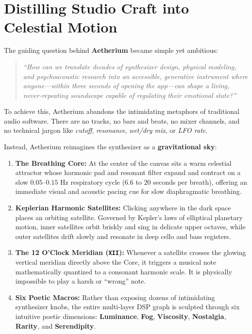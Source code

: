 \documentclass[11pt,oneside,openany]{book}
\begin{document}
\section{Distilling Studio Craft into Celestial Motion}

The guiding question behind \textbf{Aetherium} became simple yet ambitious:
\begin{quote}
\itshape
``How can we translate decades of synthesizer design, physical modeling, and psychoacoustic research into an accessible, generative instrument where anyone---within three seconds of opening the app---can shape a living, never-repeating soundscape capable of regulating their emotional state?''
\end{quote}

To achieve this, Aetherium abandons the intimidating metaphors of traditional audio software. There are no tracks, no bars and beats, no mixer channels, and no technical jargon like \textit{cutoff}, \textit{resonance}, \textit{wet/dry mix}, or \textit{LFO rate}.

Instead, Aetherium reimagines the synthesizer as a \textbf{gravitational sky}:
\begin{enumerate}
  \item \textbf{The Breathing Core:} At the center of the canvas sits a warm celestial attractor whose harmonic pad and resonant filter expand and contract on a slow $0.05\text{--}0.15\text{ Hz}$ respiratory cycle ($6.6$ to $20$ seconds per breath), offering an immediate visual and acoustic pacing cue for slow diaphragmatic breathing.
  \item \textbf{Keplerian Harmonic Satellites:} Clicking anywhere in the dark space places an orbiting satellite. Governed by Kepler's laws of elliptical planetary motion, inner satellites orbit briskly and sing in delicate upper octaves, while outer satellites drift slowly and resonate in deep cello and bass registers.
  \item \textbf{The 12 O'Clock Meridian (\texttt{XII}):} Whenever a satellite crosses the glowing vertical meridian directly above the Core, it triggers a musical note mathematically quantized to a consonant harmonic scale. It is physically impossible to play a harsh or ``wrong'' note.
  \item \textbf{Six Poetic Macros:} Rather than exposing dozens of intimidating synthesizer knobs, the entire multi-layer DSP graph is sculpted through six intuitive poetic dimensions: \textbf{Luminance}, \textbf{Fog}, \textbf{Viscosity}, \textbf{Nostalgia}, \textbf{Rarity}, and \textbf{Serendipity}.
\end{enumerate}
\end{document}
